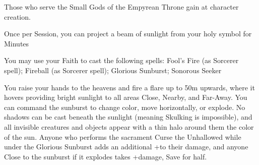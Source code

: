 {\newpage




Those who serve the Small Gods of the Empyrean Throne gain \DCUP \FOC at character creation.





\GOD[
Name=Asura,
Link=small-god-asura,
GodOf=Seraph of Sunlight,
Holy=polished mirrors or brass hung from the neck or belt
]


Once per Session, you can project a beam of sunlight from your holy symbol for Minutes


You may use your Faith to cast the following spells: Fool's Fire (as Sorcerer spell); Fireball (as Sorcerer spell); Glorious Sunburst; Sonorous Seeker

\LITURGY [
  Name= Glorious Sunburst,
  Link= asura-liturgy-glorious-sunburst,
  Paradigm= Elements ,
  Save=  Y (half) ,
  Duration= Combat or \SUMDICE Minutes ,
  Counter=  n/a  ,
  Keywords= None ,
  Target=   Up to 50m straight up
]



You raise your hands to the heavens and fire a flare up to 50m upwards, where it hovers providing bright sunlight to all areas Close, Nearby, and Far-Away.  You can command the sunburst to change color, move horizontally, or explode.  No shadows can be cast beneath the sunlight (meaning Skulking is impossible), and all invisible creatures and objects appear with a thin halo around them the color of the sun.  Anyone who performs the sacrament Curse the Unhallowed while under the Glorious Sunburst adds an additional +\DICE to their damage, and anyone Close to the sunburst if it explodes takes \SUMDICE+\DICE damage, Save for half.

\LITURGY [
  Name= Sonorous Seeker,
  Link=asura-liturgy-sonorous seeker,
  Paradigm= Prophesy ,
  Save=  N ,
  Duration= \SUMDICE Minutes ,
  Counter=  n/a  ,
  Keywords= None ,
  Target=   Object up to \DICE km away
]



}
